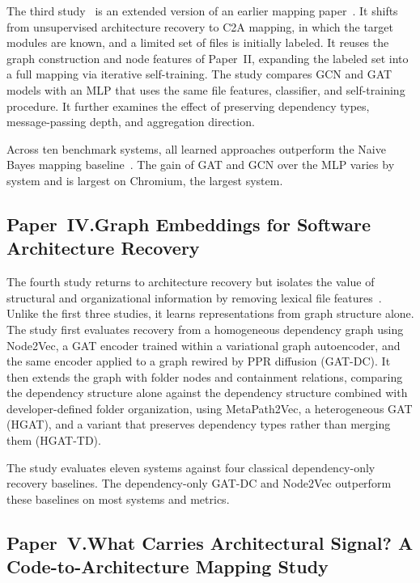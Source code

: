 The third study~\cite{c2a_mapping} is an extended version of an earlier mapping paper~\cite{jabeen2025graph}. It shifts from unsupervised architecture recovery to C2A mapping, in which the target modules are known, and a limited set of files is initially labeled. It reuses the graph construction and node features of Paper~II, expanding the labeled set into a full mapping via iterative self-training. The study compares GCN and GAT models with an MLP that uses the same file features, classifier, and self-training procedure. It further examines the effect of preserving dependency types, message-passing depth, and aggregation direction.
 
Across ten benchmark systems, all learned approaches outperform the Naive Bayes mapping baseline~\cite{olsson2022automatically}. The gain of GAT and GCN over the MLP varies by system and is largest on Chromium, the largest system.

\subsection[Paper~IV: Software Architecture Recovery]{Paper~IV.\quad Graph Embeddings for Software Architecture Recovery}
\label{sec:overview-structsar}

The fourth study returns to architecture recovery but isolates the value of structural and organizational information by removing lexical file features~\cite{structsar}. Unlike the first three studies, it learns representations from graph structure alone. The study first evaluates recovery from a homogeneous dependency graph using Node2Vec, a GAT encoder trained within a variational graph autoencoder, and the same encoder applied to a graph rewired by PPR diffusion (GAT-DC). It then extends the graph with folder nodes and containment relations, comparing the dependency structure alone against the dependency structure combined with developer-defined folder organization, using MetaPath2Vec, a heterogeneous GAT (HGAT), and a variant that preserves dependency types rather than merging them (HGAT-TD).
 
The study evaluates eleven systems against four classical dependency-only recovery baselines. The dependency-only GAT-DC and Node2Vec outperform these baselines on most systems and metrics.

\subsection[Paper~V: Code-to-Architecture Mapping]{Paper~V.\quad What Carries Architectural Signal? A Code-to-Architecture Mapping Study}
\label{sec:overview-hetmap}

